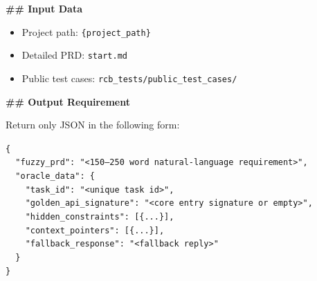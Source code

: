 \begin{promptbox}
\textbf{\#\# Input Data}
\begin{itemize}
\item Project path: \texttt{\{project\_path\}}
\item Detailed PRD: \texttt{start.md}
\item Public test cases: \texttt{rcb\_tests/public\_test\_cases/}
\end{itemize}

\textbf{\#\# Output Requirement}

Return only JSON in the following form:

\texttt{\{}\\
\texttt{~~"fuzzy\_prd": "<150--250 word natural-language requirement>",}\\
\texttt{~~"oracle\_data": \{}\\
\texttt{~~~~"task\_id": "<unique task id>",}\\
\texttt{~~~~"golden\_api\_signature": "<core entry signature or empty>",}\\
\texttt{~~~~"hidden\_constraints": [\{...\}],}\\
\texttt{~~~~"context\_pointers": [\{...\}],}\\
\texttt{~~~~"fallback\_response": "<fallback reply>"}\\
\texttt{~~\}}\\
\texttt{\}}
\end{promptbox}
